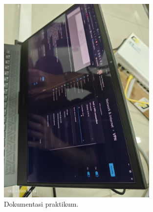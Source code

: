 \begin{figure}[H]
    \centering
    \includegraphics[width=0.7\textwidth]{img5/lampiran5.jpeg} 
    \caption{Dokumentasi praktikum.}
\end{figure}

